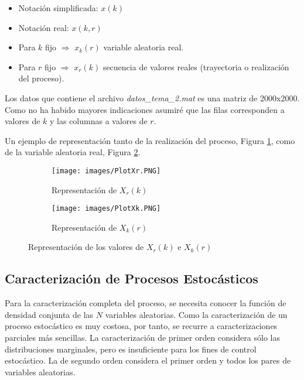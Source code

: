 \documentclass[a4paper, fontsize=11pt]{scrartcl} %
\numberwithin{equation}{section} %
\numberwithin{figure}{section} %
\numberwithin{table}{section} %
\begin{document}
	\begin{itemize}
		\item Notación simplificada: $x(k)$
		\item Notación real: $x(k,r)$
		\item Para $k$ fijo $\Longrightarrow$ $x_k(r)$ variable aleatoria real.
		\item Para $r$ fijo $\Longrightarrow$ $x_r(k)$ secuencia de valores reales (trayectoria o realización del proceso).
	\end{itemize}
	
	Los datos que contiene el archivo \textit{datos\_tema\_2.mat} es una matriz de 2000x2000. Como no ha habido mayores indicaciones asumiré que las filas corresponden a valores de $k$ y las columnas a valores de $r$.
	
	Un ejemplo de representación tanto de la realización del proceso, Figura \ref{PlotXr}, como de la variable aleatoria real, Figura \ref{PlotXk}.
	
	\begin{figure}[h!]
		\centering
		\begin{subfigure}{0.5\textwidth}
			\centering
			\texttt{[image: images/PlotXr.PNG]}
			\caption{Representación de $X_r(k)$}
			\label{PlotXr}
		\end{subfigure}%
		\begin{subfigure}{0.5\textwidth}
			\centering
			\texttt{[image: images/PlotXk.PNG]}
			\caption{Representación de $X_k(r)$}
			\label{PlotXk}
		\end{subfigure}
		\caption{Representación de los valores de $X_r(k)$ e $X_k(r)$}
		\label{Plots}
	\end{figure}
	\FloatBarrier
	
	\subsection{Caracterización de Procesos Estocásticos}
	
	Para la caracterización completa del proceso, se necesita conocer la función de densidad conjunta de las $N$ variables aleatorias. Como la caracterización de un proceso estocástico es muy costosa, por tanto, se recurre a caracterizaciones parciales más sencillas. La caracterización de primer orden considera sólo las distribuciones marginales, pero es insuficiente para los fines de control estocástico. La de segundo orden considera el primer orden y todos los pares de variables aleatorias.\\
	
\end{document}
